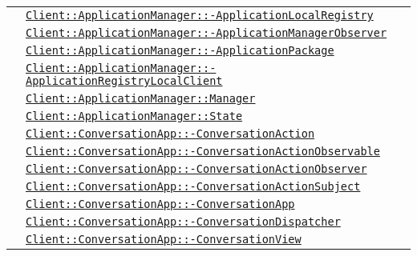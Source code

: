\begin{longtable}{|>{\centering}m{3cm}|m{10cm}<{\centering}|}
& \hyperref[Client::ApplicationManager::ApplicationLocalRegistry]{\texttt{Client::ApplicationManager::-\linebreak ApplicationLocalRegistry}}\\
& \hyperref[Client::ApplicationManager::ApplicationManagerObserver]{\texttt{Client::ApplicationManager::-\linebreak ApplicationManagerObserver}}\\
& \hyperref[Client::ApplicationManager::ApplicationPackage]{\texttt{Client::ApplicationManager::-\linebreak ApplicationPackage}}\\
& \hyperref[Client::ApplicationManager::ApplicationRegistryLocalClient]{\texttt{Client::ApplicationManager::-\linebreak ApplicationRegistryLocalClient}}\\
& \hyperref[Client::ApplicationManager::Manager]{\texttt{Client::ApplicationManager::Manager}}\\
& \hyperref[Client::ApplicationManager::State]{\texttt{Client::ApplicationManager::State}}\\
& \hyperref[Client::ConversationApp::ConversationAction]{\texttt{Client::ConversationApp::-\linebreak ConversationAction}}\\
& \hyperref[Client::ConversationApp::ConversationActionObservable]{\texttt{Client::ConversationApp::-\linebreak ConversationActionObservable}}\\
& \hyperref[Client::ConversationApp::ConversationActionObserver]{\texttt{Client::ConversationApp::-\linebreak ConversationActionObserver}}\\
& \hyperref[Client::ConversationApp::ConversationActionSubject]{\texttt{Client::ConversationApp::-\linebreak ConversationActionSubject}}\\
& \hyperref[Client::ConversationApp::ConversationApp]{\texttt{Client::ConversationApp::-\linebreak ConversationApp}}\\
& \hyperref[Client::ConversationApp::ConversationDispatcher]{\texttt{Client::ConversationApp::-\linebreak ConversationDispatcher}}\\
& \hyperref[Client::ConversationApp::ConversationView]{\texttt{Client::ConversationApp::-\linebreak ConversationView}}\\

\end{longtable}
